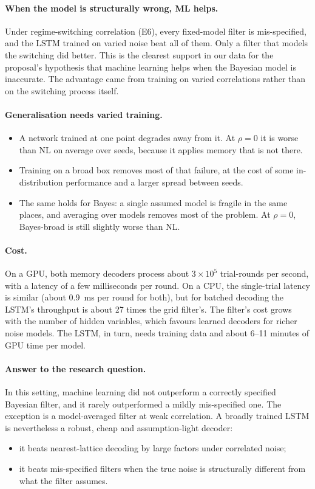 \paragraph{When the model is structurally wrong, ML helps.}
Under regime-switching correlation (E6), every fixed-model filter is
mis-specified, and the LSTM trained on varied noise beat all of them. Only a
filter that models the switching did better. This is the clearest support in
our data for the proposal's hypothesis that machine learning helps when the
Bayesian model is inaccurate. The advantage came from training on varied
correlations rather than on the switching process itself.

\paragraph{Generalisation needs varied training.}
\begin{itemize}
  \item A network trained at one point degrades away from it. At $\rho=0$ it
    is worse than NL on average over seeds, because it applies memory that is
    not there.
  \item Training on a broad box removes most of that failure, at the cost of
    some in-distribution performance and a larger spread between seeds.
  \item The same holds for Bayes: a single assumed model is fragile in the
    same places, and averaging over models removes most of the problem. At
    $\rho=0$, Bayes-broad is still slightly worse than NL.
\end{itemize}

\paragraph{Cost.}
On a GPU, both memory decoders process about $3\times10^5$ trial-rounds per
second, with a latency of a few milliseconds per round. On a CPU, the
single-trial latency is similar (about 0.9~ms per round for both), but for
batched decoding the LSTM's throughput is about 27 times the grid filter's.
The filter's cost grows with the number of hidden variables, which favours
learned decoders for richer noise models. The LSTM, in turn, needs training
data and about 6--11 minutes of GPU time per model.

\paragraph{Answer to the research question.}
In this setting, machine learning did not outperform a correctly specified
Bayesian filter, and it rarely outperformed a mildly mis-specified one. The
exception is a model-averaged filter at weak correlation. A broadly trained
LSTM is nevertheless a robust, cheap and assumption-light decoder:
\begin{itemize}
  \item it beats nearest-lattice decoding by large factors under correlated
    noise;
  \item it beats mis-specified filters when the true noise is structurally
    different from what the filter assumes.
\end{itemize}
